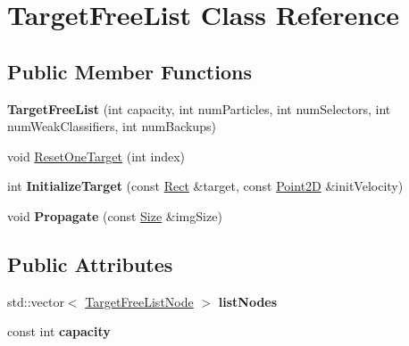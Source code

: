 \hypertarget{classTargetFreeList}{}\section{Target\+Free\+List Class Reference}
\label{classTargetFreeList}
\subsection*{Public Member Functions}
\begin{DoxyCompactItemize}
\item 
\hypertarget{classTargetFreeList_a28272588d353e55cf201ae0b37598ff8}{}{\bfseries Target\+Free\+List} (int capacity, int num\+Particles, int num\+Selectors, int num\+Weak\+Classifiers, int num\+Backups)\label{classTargetFreeList_a28272588d353e55cf201ae0b37598ff8}

\item 
void \hyperlink{classTargetFreeList_ad9fc512ed531b89b0c1c5d8ff85dd5f7}{Reset\+One\+Target} (int index)
\item 
\hypertarget{classTargetFreeList_a9e78fb14c928075a1eef8bd167f9a3b3}{}int {\bfseries Initialize\+Target} (const \hyperlink{classRect}{Rect} \&target, const \hyperlink{classPoint2D}{Point2\+D} \&init\+Velocity)\label{classTargetFreeList_a9e78fb14c928075a1eef8bd167f9a3b3}

\item 
\hypertarget{classTargetFreeList_a06f32787f7684d164a608ce901fc676b}{}void {\bfseries Propagate} (const \hyperlink{classSize}{Size} \&img\+Size)\label{classTargetFreeList_a06f32787f7684d164a608ce901fc676b}

\end{DoxyCompactItemize}
\subsection*{Public Attributes}
\begin{DoxyCompactItemize}
\item 
\hypertarget{classTargetFreeList_a372b8ad58b14cc943bbba0c5eaf13ab6}{}std\+::vector$<$ \hyperlink{structTargetFreeListNode}{Target\+Free\+List\+Node} $>$ {\bfseries list\+Nodes}\label{classTargetFreeList_a372b8ad58b14cc943bbba0c5eaf13ab6}

\item 
\hypertarget{classTargetFreeList_aae0b9a7f6b9a58348c22b89d3076fad7}{}const int {\bfseries capacity}\label{classTargetFreeList_aae0b9a7f6b9a58348c22b89d3076fad7}

\end{DoxyCompactItemize}


